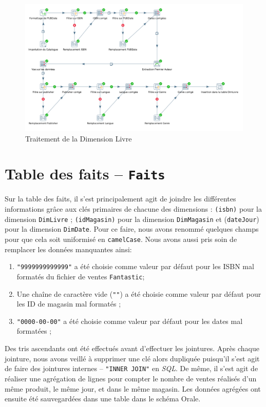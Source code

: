 	\begin{figure}[H]
      \centerline{\includegraphics[width=\textwidth]{../TD2/screenshots/screenScriptDimLivre.png}}
      \caption{Traitement de la Dimension Livre}
      \label{livre}
  	\end{figure}
  	


\section{Table des faits -- \texttt{Faits}}
	
	Sur la table des faits, il s'est principalement agit de joindre les différentes informations grâce aux clés primaires de chacune des dimensions : \texttt{(isbn)} pour la dimension \texttt{DimLivre} ; \texttt{(idMagasin)} pour la dimension \texttt{DimMagasin} et (\texttt{dateJour}) pour la dimension \texttt{DimDate}. Pour ce faire, nous avons renommé quelques champs pour que cela soit uniformisé en \texttt{camelCase}. Nous avons aussi pris soin de remplacer les données manquantes ainsi:
	\begin{enumerate}
		\item \texttt{"9999999999999"} a été choisie comme valeur par défaut pour les ISBN mal formatés du fichier de ventes \texttt{Fantastic};
		\item Une chaîne de caractère vide (\texttt{""}) a été choisie comme valeur par défaut pour les ID de magasin mal formatés ;
		\item \texttt{"0000-00-00"} a été choisie comme valeur par défaut pour les dates mal formatées ;
	\end{enumerate}

	Des tris ascendants ont été effectués avant d'effectuer les jointures. Après chaque jointure, nous avons veillé à supprimer une clé alors dupliquée puisqu'il s'est agit de faire des jointures internes -- \texttt{"INNER JOIN"} en \textit{SQL}. De même, il s'est agit de réaliser une agrégation de lignes pour compter le nombre de ventes réalisés d'un même produit, le même jour, et dans le même magasin. Les données agrégées ont ensuite été sauvegardées dans une table dans le schéma Orale.\\

